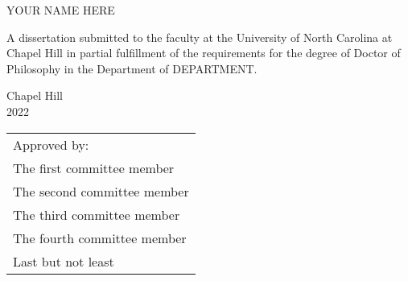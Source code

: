 \documentclass[crop=false,12pt,class=report]{standalone}
\begin{document}
\begin{singlespacing}
\begin{center}
        \MakeUppercase{\mytitle}
        
        \vspace{1in}
        {\color{red}
        YOUR NAME HERE
        }
        
        \vspace{1in}
        A dissertation submitted to the faculty at the University of North Carolina at Chapel Hill in partial fulfillment of the requirements for the degree of Doctor of Philosophy in the Department of {\color{red} DEPARTMENT}.
        
        \vspace{1in}
        Chapel Hill\\
        2022
    \end{center}
    
    \vspace{1in}
    {
    \renewcommand{\arraystretch}{1.5}
    \hfill \begin{tabular}{l}
        Approved by:\\
        The first committee member\\
        The second committee member\\
        The third committee member\\
        The fourth committee member\\
        Last but not least
    \end{tabular}
    }
\end{singlespacing}    
\thispagestyle{empty} %
\restoregeometry
\end{document}
